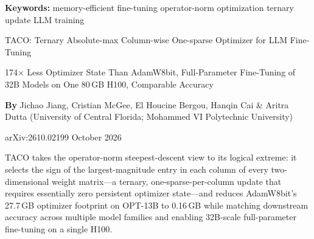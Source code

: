 \documentclass[10pt,twocolumn]{article}
\begin{document}
\setlength{\parindent}{0pt}
\setlength{\parskip}{4pt}

{\small\color{keywordgray}\textbf{Keywords:}
  memory-efficient fine-tuning \textbullet{}
  operator-norm optimization \textbullet{}
  ternary update \textbullet{}
  LLM training}\par\vspace{4pt}

{\LARGE\bfseries\raggedright
  TACO: Ternary Absolute-max Column-wise One-sparse Optimizer for LLM Fine-Tuning}\par\vspace{4pt}

{\large\itshape\raggedright
  174$\times$ Less Optimizer State Than AdamW8bit, Full-Parameter Fine-Tuning of 32B Models
  on One 80\,GB H100, Comparable Accuracy}\par\vspace{6pt}

{\small\textbf{By} Jichao Jiang, Cristian McGee, El Houcine Bergou,
  Hanqin Cai \& Aritra Dutta (University of Central Florida;
  Mohammed VI Polytechnic University)}\par\vspace{2pt}

{\small\color{keywordgray}arXiv:2610.02199 \textbullet{} October 2026}
\par\vspace{2pt}\noindent{\color{rulered}\rule{\columnwidth}{0.6pt}}\vspace{6pt}

TACO takes the operator-norm steepest-descent view to its logical extreme:
it selects the sign of the largest-magnitude entry in each column of every
two-dimensional weight matrix---a ternary, one-sparse-per-column update that
requires essentially zero persistent optimizer state---and reduces AdamW8bit's
27.7\,GB optimizer footprint on OPT-13B to 0.16\,GB while matching downstream
accuracy across multiple model families and enabling 32B-scale full-parameter
fine-tuning on a single H100.
\end{document}
